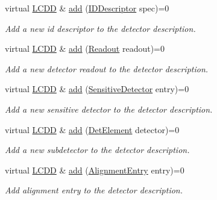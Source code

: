 \begin{DoxyCompactItemize}
virtual \hyperlink{class_d_d4hep_1_1_geometry_1_1_l_c_d_d}{LCDD} \& \hyperlink{class_d_d4hep_1_1_geometry_1_1_l_c_d_d_a346e521d7e74531597650fa812394e89}{add} (\hyperlink{class_d_d4hep_1_1_geometry_1_1_i_d_descriptor}{IDDescriptor} spec)=0
\begin{DoxyCompactList}\small\item\em Add a new id descriptor to the detector description. \item\end{DoxyCompactList}\item 
virtual \hyperlink{class_d_d4hep_1_1_geometry_1_1_l_c_d_d}{LCDD} \& \hyperlink{class_d_d4hep_1_1_geometry_1_1_l_c_d_d_a68f3490691ccf2937987fbb60969a70d}{add} (\hyperlink{class_d_d4hep_1_1_geometry_1_1_readout}{Readout} readout)=0
\begin{DoxyCompactList}\small\item\em Add a new detector readout to the detector description. \item\end{DoxyCompactList}\item 
virtual \hyperlink{class_d_d4hep_1_1_geometry_1_1_l_c_d_d}{LCDD} \& \hyperlink{class_d_d4hep_1_1_geometry_1_1_l_c_d_d_a6c10312be5b4fdf8132e25eae6abdac0}{add} (\hyperlink{class_d_d4hep_1_1_geometry_1_1_sensitive_detector}{SensitiveDetector} entry)=0
\begin{DoxyCompactList}\small\item\em Add a new sensitive detector to the detector description. \item\end{DoxyCompactList}\item 
virtual \hyperlink{class_d_d4hep_1_1_geometry_1_1_l_c_d_d}{LCDD} \& \hyperlink{class_d_d4hep_1_1_geometry_1_1_l_c_d_d_a9b756dac3f0ebc5393072f23c96cb490}{add} (\hyperlink{class_d_d4hep_1_1_geometry_1_1_det_element}{DetElement} detector)=0
\begin{DoxyCompactList}\small\item\em Add a new subdetector to the detector description. \item\end{DoxyCompactList}\item 
virtual \hyperlink{class_d_d4hep_1_1_geometry_1_1_l_c_d_d}{LCDD} \& \hyperlink{class_d_d4hep_1_1_geometry_1_1_l_c_d_d_a338b46c3a01bcd48b9c9f8ad74501c1d}{add} (\hyperlink{class_d_d4hep_1_1_geometry_1_1_alignment_entry}{AlignmentEntry} entry)=0
\begin{DoxyCompactList}\small\item\em Add alignment entry to the detector description. \item\end{DoxyCompactList}\item 

\end{DoxyCompactItemize}
